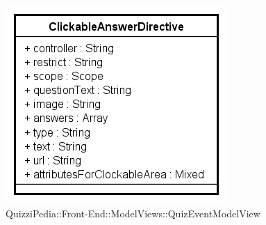 							\begin{figure}[ht]
								\centering
								\includegraphics[scale=0.5,keepaspectratio]{UML/Classi/Front-End/QuizziPedia_Front-end_Templates_ClickableAnswerTemplate.png}
								\caption{QuizziPedia::Front-End::ModelViews::QuizEventModelView}
							\end{figure} \FloatBarrier
							
